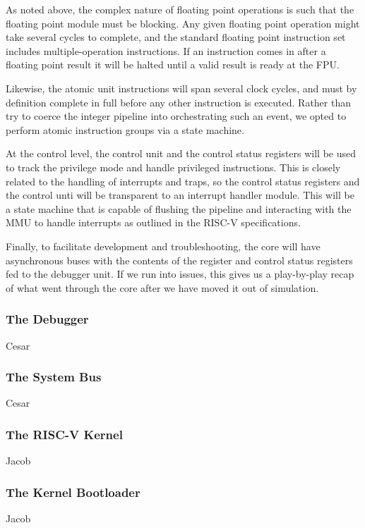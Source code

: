 \documentclass{article}
\begin{document}
    As noted above, the complex nature of floating point operations is such that the floating point module must be blocking. Any given floating point operation might take several cycles to complete, and the standard floating point instruction set includes multiple-operation instructions. If an instruction comes in after a floating point result it will be halted until a valid result is ready at the FPU.
    
    Likewise, the atomic unit instructions will span several clock cycles, and must by definition complete in full before any other instruction is executed.  Rather than try to coerce the integer pipeline into orchestrating such an event, we opted to perform atomic instruction groups via a state machine.
    
    At the control level, the control unit and the control status registers will be used to track the privilege mode and handle privileged instructions.  This is closely related to the handling of interrupts and traps, so the control status registers and the control unti will be transparent to an interrupt handler module.  This will be a state machine that is capable of flushing the pipeline and interacting with the MMU to handle interrupts as outlined in the RISC-V specifications.
    
    Finally, to facilitate development and troubleshooting, the core will have asynchronous buses with the contents of the register and control status registers fed to the debugger unit.  If we run into issues, this gives us a play-by-play recap of what went through the core after we have moved it out of simulation.
    
    \subsubsection{The Debugger}
    Cesar
    
    \subsubsection{The System Bus}
    Cesar
    
    \subsubsection{The RISC-V Kernel}
    Jacob
    
    \subsubsection{The Kernel Bootloader}
    Jacob
    
\end{document}
